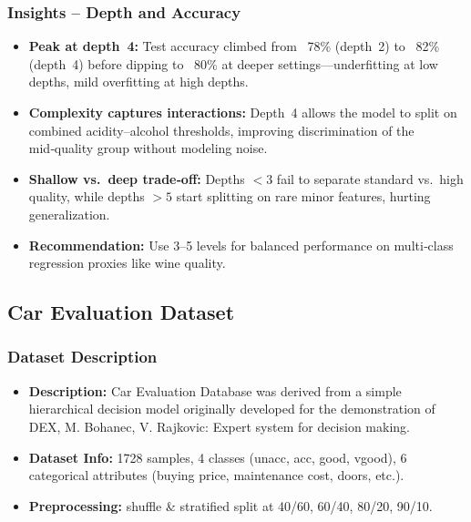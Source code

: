 \subsubsection*{Insights – Depth and Accuracy}
\begin{itemize}
	\item \textbf{Peak at depth 4:} Test accuracy climbed from ~78\% (depth 2) to ~82\% (depth 4) before dipping to ~80\% at deeper settings—underfitting at low depths, mild overfitting at high depths.
	\item \textbf{Complexity captures interactions:} Depth 4 allows the model to split on combined acidity–alcohol thresholds, improving discrimination of the mid‑quality group without modeling noise.
	\item \textbf{Shallow vs.\ deep trade‑off:} Depths \(<3\) fail to separate standard vs.\ high quality, while depths \(>5\) start splitting on rare minor features, hurting generalization.
	\item \textbf{Recommendation:} Use 3–5 levels for balanced performance on multi‑class regression proxies like wine quality.
\end{itemize}

\clearpage
\subsection{Car Evaluation Dataset}
\subsubsection*{Dataset Description}
\begin{itemize}
	\item \textbf{Description:} Car Evaluation Database was derived from a simple hierarchical decision model originally developed for the demonstration of DEX, M. Bohanec, V. Rajkovic: Expert system for decision making.
	\item \textbf{Dataset Info:} 1728 samples, 4 classes (unacc, acc, good, vgood), 6 categorical attributes (buying price, maintenance cost, doors, etc.).
	\item \textbf{Preprocessing:} shuffle \& stratified split at 40/60, 60/40, 80/20, 90/10.
\end{itemize}

